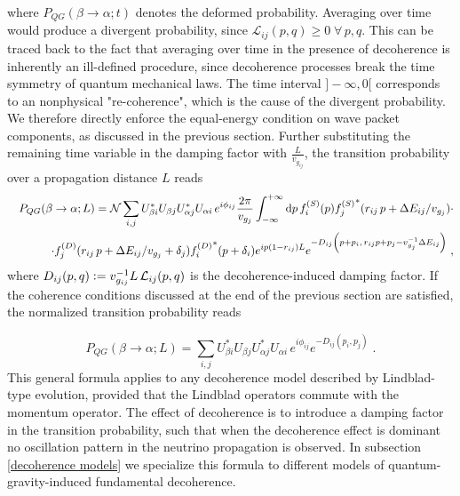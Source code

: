 \documentclass[11pt]{article}
\newcommand{\ebd}{\vcentcolon =}
\newcommand{\inttt}[1]{\int_{-\infty}^{+\infty}\dd{#1}}
\begin{document}
where $P_{QG}(\beta\to\alpha;t)$ denotes the deformed probability. Averaging over time would produce a divergent probability, since $\mathcal{L}_{ij}(p,q)\geq 0\;\forall\,p,q$. This can be traced back to the fact that averaging over time in the presence of  decoherence  is inherently an ill-defined procedure, since decoherence processes break the time symmetry of quantum mechanical laws. The time interval $]-\infty,0[$ corresponds to an nonphysical "re-coherence", which is the cause of the divergent probability. We therefore directly enforce the equal-energy condition on wave packet components, as discussed in the previous section.  Further substituting the remaining time variable in the damping factor with $\frac{L}{v_{g_{ij}}}$, the transition probability over a propagation distance $L$ reads
\begin{eqnarray}
    &&P_{QG}(\beta\to\alpha;L) = \mathcal{N}\sum_{i,j} U^*_{\beta i} U_{\beta j} U^*_{\alpha j} U_{\alpha i} \,e^{i \phi_{ij}} \frac{2\pi}{v_{g_j}}\inttt{p} f_i^{(S)}(p) {f_j^{(S)}}^*(r_{ij}\,p+\Delta E_{ij}/v_{g_j}) \cdot\nonumber \\ &&\cdot f_j^{(D)}(r_{ij}\,p+\Delta E_{ij}/v_{g_j}+\delta_j) {f_i^{(D)}}^*(p+\delta_i) e^{ip(1-r_{ij})L}e^{-D_{ij}\qty(p+p_i,\,r_{ij}p+p_j-v_{g_j}^{-1}\Delta E_{ij})}\;,\label{oscillation probability decohe wave-packet general}
\end{eqnarray}
where $D_{ij}(p,q)\ebd v_{g_{ij}}^{-1}L\,\mathcal{L}_{ij}(p,q)$ is the decoherence-induced damping factor. If the coherence conditions discussed at the end of the previous section are satisfied, the normalized transition probability reads 

\begin{equation}
    P_{QG}(\beta\to\alpha;L) = \sum_{i,j} U^*_{\beta i} U_{\beta j} U^*_{\alpha j} U_{\alpha i} \,e^{i \phi_{ij}} e^{-D_{ij}(p_i,p_j)}\;.\label{Oscillation probability decoh general}
\end{equation}
This general formula applies to any decoherence model described by Lindblad-type evolution, provided that the Lindblad operators commute with the momentum operator.
The effect of decoherence is to introduce a damping factor in the transition probability, such that when the decoherence effect is dominant no oscillation pattern in the neutrino propagation is observed.
In subsection \ref{decoherence models} we specialize this formula  to different models of quantum-gravity-induced fundamental decoherence. 
\end{document}

